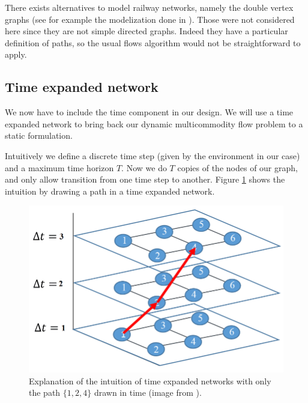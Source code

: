 \documentclass[14pt,a4paper]{article}
\theoremstyle{definition}
\numberwithin{equation}{subsection}
\begin{document}
There exists alternatives to model railway networks, namely the double vertex graphs (see for example the modelization done in  \cite{BachelorThesis}). Those were not considered here since they are not simple directed graphs. Indeed they have a particular definition of paths, so the usual flows algorithm would not be straightforward to apply.





\subsection{Time expanded network}
\label{ten}

We now have to include the time component in our design. We will use a time expanded network to bring back our dynamic multicommodity flow problem to a static formulation. 

Intuitively we define a discrete time step (given by the environment in our case) and a maximum time horizon $T$. Now we do $T$ copies of the nodes of our graph, and only allow transition from one time step to another. Figure \ref{fig:ten intuition} shows the intuition by drawing a path in a time expanded network.


\begin{figure}[h]
	\centering
	\includegraphics[width=0.6\linewidth]{img/Example-of-links-in-a-time-expanded-network.png}
	\caption{Explanation of the intuition of time expanded networks with only the path $\{1,2,4\}$ drawn in time (image from \cite{TENExample}).}
	\label{fig:ten intuition}
\end{figure}
\end{document}
